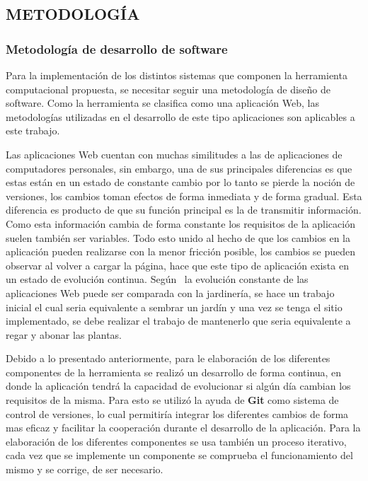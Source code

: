 
\subsection{METODOLOGÍA}
\subsubsection{Metodología de desarrollo de software}

Para la implementación de los distintos sistemas que componen la herramienta
computacional propuesta, se necesitar seguir una metodología de diseño de
software. Como la herramienta se clasifica como una aplicación Web, las
metodologías utilizadas en el desarrollo de este tipo aplicaciones son
aplicables a este trabajo.

Las aplicaciones Web cuentan con muchas similitudes a las de aplicaciones de
computadores personales, sin embargo, una de sus principales diferencias es que
estas están en un estado de constante cambio por lo tanto
se pierde la noción de versiones, los cambios toman efectos de forma inmediata
y de forma gradual. Esta diferencia es producto de que su función principal es
la de transmitir información. Como esta información cambia de forma constante
los requisitos de la aplicación suelen también ser variables. Todo esto unido
al hecho de que los cambios en la aplicación pueden realizarse con la
menor fricción posible, los cambios se pueden observar al volver a cargar la
página, hace que este tipo de aplicación  exista en un estado de evolución
continua. Según \textcite{pressman2002}\  la evolución constante de las aplicaciones
Web puede ser comparada con la jardinería, se hace un trabajo inicial el cual
seria equivalente a sembrar un jardín y una vez se tenga el sitio implementado,
se debe realizar el trabajo de mantenerlo que seria equivalente a regar y
abonar las plantas.

Debido a lo presentado anteriormente, para le elaboración de los diferentes
componentes de la herramienta se realizó un desarrollo de forma continua,
en donde la aplicación tendrá la capacidad de evolucionar si algún día
cambian los requisitos de la misma. Para esto se utilizó la ayuda de
\textbf{Git} como sistema de control de versiones, lo cual permitiría integrar
los diferentes cambios de forma mas eficaz y facilitar la cooperación durante
el desarrollo de la aplicación. Para la elaboración de los diferentes
componentes se usa también un proceso iterativo, cada vez que se implemente
un componente se comprueba el funcionamiento del mismo y se corrige, de ser
necesario.

